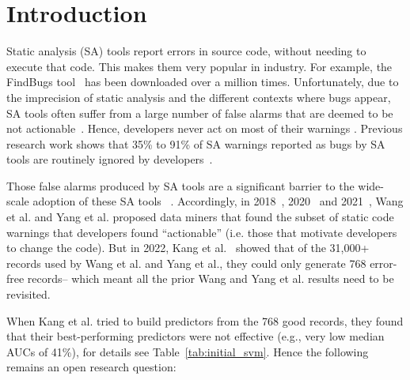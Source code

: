 \documentclass[compsoc,10pt]{IEEEtran}
\begin{document}
\maketitle

%
\IEEEpeerreviewmaketitle



\section{Introduction}\label{intro}
  

Static analysis (SA) tools report errors
in source code, without needing to execute that code. This makes them very popular in industry. For example, the FindBugs tool~\cite{ayewah2010google}
has been downloaded over a million times. Unfortunately, due to the imprecision of static analysis and the different contexts where bugs appear, SA tools often suffer from
a large number of false alarms that are deemed to be not actionable~\cite{tomassi2021real}.
Hence, developers never act on most of 
their warnings \cite{heckman2008establishing, heckman2009model, kim2007warnings}. 
 Previous research work shows that   35\% to
91\% of SA warnings reported as bugs by SA tools 
are routinely
ignored by developers~\cite{heckman2009model,heckman2008establishing,kim07}.

Those  false alarms produced by SA tools are a significant barrier to the wide-scale adoption of these SA tools ~\cite{johnson2013don,ChristakisB16}. 
Accordingly, in 2018~\cite{wang2018there}, 2020~\cite{yang2021learning}
and 2021~\cite{yang2021understanding}, Wang et al. and Yang et al. proposed
data miners that  found the subset of static code warnings that
developers found ``actionable'' (i.e. those that
motivate developers to change the code). 
But in 2022, Kang et al.~\cite{kang2022detecting} showed that of the
31,000+ records used by  
Wang et al. and Yang et al., they could only generate 768  error-free records-- which meant all the prior Wang and Yang et al. results need to be revisited.

When Kang et al. tried to build predictors from the 768 good records, they found that their   best-performing predictors were not effective
(e.g., very low median AUCs of 41\%), for details see 
Table~\ref{tab:initial_svm}. 
  Hence the following remains an open research question:
 
\end{document}
